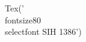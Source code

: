 \documentclass[preview]{standalone}
\begin{document}
\begin{center}
Tex('\\fontsize{8}{0}\\selectfont SIH 1386')
\end{center}
\end{document}
